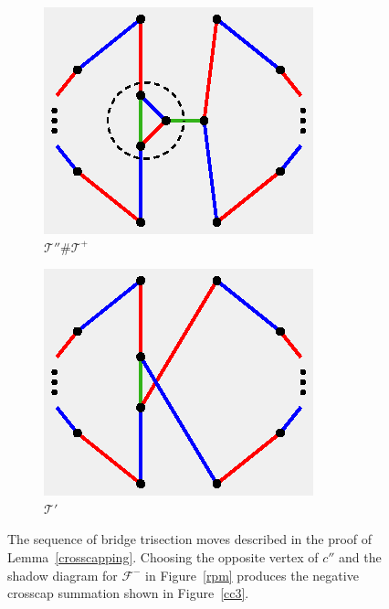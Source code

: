 \documentclass[11pt, oneside]{amsart}
\theoremstyle{theorem}
\theoremstyle{definition}
\newcommand{\F}{\mathcal{F}}
\newcommand{\T}{\mathcal{T}}
\theoremstyle{theorem}
\begin{document}
\begin{figure}[h!]
\begin{subfigure}{.24\textwidth}
  \includegraphics[width=.9\linewidth]{perturbplus.eps}
  \caption{$\T'' \# \T^+$}
  \label{lem3}
\end{subfigure}
\begin{subfigure}{.24\textwidth}
  \centering
  \includegraphics[width=.9\linewidth]{cperturb1.eps}
  \caption{$\T'$}
  \label{lem4}
\end{subfigure}
\caption{The sequence of bridge trisection moves described in the proof of Lemma~\ref{crosscapping}.  Choosing the opposite vertex of $c''$ and the shadow diagram for $\F^-$ in Figure~\ref{rpm} produces the negative crosscap summation shown in Figure~\ref{cc3}.}
\label{threestep}
\end{figure}
\end{document}
